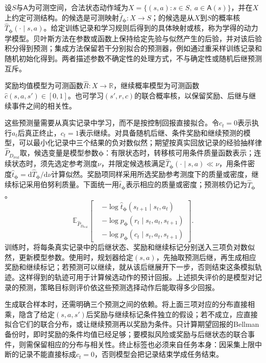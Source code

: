 \begin{definition}[学得环境模型的预测对象]
  \label{def:rl-learning-learned-model}
  设$S$与$\mathsf A$为可测空间，合法状态动作域为$X=\{(s,a):s\in S,\ a\in\mathsf A(s)\}$，并在$X$上约定可测结构。的候选是可测映射$\widehat f_{\bm\phi}:X\to S$；的候选是从$X$到$S$的概率核$\widehat T_{\bm\phi}(\cdot\mid s,a)$。给定训练记录和学习规则后得到的具体映射或核，称为学得的动力学模型。贝叶斯方法在参数或函数上保持给定先验与似然产生的后验，并对该后验积分得到预测；集成方法保留若干分别拟合的预测器，例如通过重采样训练记录和随机初始化得到。两者描述参数不确定性的处理方式，不与确定性或随机后继预测互斥。

  奖励均值模型为可测函数$\widehat R:X\to\mathbb R$，继续概率模型为可测函数$\widehat c(s,a,s')\in[0,1]$。也可学习$(s',r,c)$的联合概率核，以保留奖励、后继与继续事件之间的相关性。
\end{definition}
这些预测量需要从真实记录中学习，而不是按控制回报直接拟合。令$c_t=0$表示执行$a_t$后真正终止，$c_t=1$表示继续。对具备随机后继、条件奖励和继续预测的模型，可以最小化记录中三个结果的负对数似然；期望按真实回放记录的经验抽样律$\widehat P_{D_{\mathrm{real}}}$取，候选变量是模型参数$\bm\phi$：有限状态时，转移核可用条件质量函数表示；连续状态时，须先选定参考测度$\nu$，并限定候选核满足$\widehat T_{\bm\phi}(\cdot\mid s,a)\ll\nu$，用条件密度$\widehat t_{\bm\phi}=\mathrm d\widehat T_{\bm\phi}/\mathrm d\nu$计算似然。奖励项同样采用所选奖励参考测度下的质量或密度，继续标记采用伯努利质量。下面统一用$\widehat t_{\bm\phi}$表示相应的质量或密度；预测核仍记为$\widehat T_{\bm\phi}$。
\[
  \mathbb E_{\widehat P_{D_{\mathrm{real}}}}\!\left[
    \begin{aligned}
      &-\log\widehat t_{\bm\phi}(s_{t+1}\mid s_t,a_t)\\
      &-\log p_{\bm\phi}(r_t\mid s_t,a_t,s_{t+1})\\
      &-\log p_{\bm\phi}(c_t\mid s_t,a_t,s_{t+1})
    \end{aligned}
  \right].
\]
训练时，将每条真实记录中的后继状态、奖励和继续标记分别送入三项负对数似然，更新模型参数。使用时，规划器给定$(s,a)$，先抽取预测后继，再生成相应奖励和继续标记；若预测可以继续，就从该后继展开下一步，否则结束这条模拟轨迹。这样得到的轨迹可用于计算候选动作的预计回报。上述损失评价的是模型对记录的预测，策略目标则评价依这些预测选择动作后能取得多少回报。

生成联合样本时，还需明确三个预测之间的依赖。将上面三项对应的分布直接相乘，隐含了给定$(s,a,s')$后奖励与继续标记条件独立的假设；若不成立，应直接拟合它们的联合分布，或让继续预测再以奖励为条件。只计算期望回报的Bellman备份时，即时奖励的条件均值已经足够；要模拟风险或奖励与后继状态的联合事件，则需保留相应的分布与相关性。终止标签也必须来自任务本身：因采集上限中断的记录不能直接标成$c_t=0$，否则模型会把记录结束学成任务结束。

